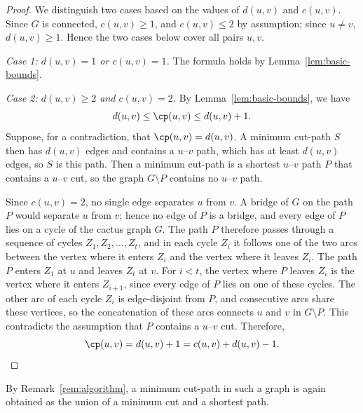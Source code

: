 \begin{proof}
We distinguish two cases based on the values of $d(u, v)$ and $c(u, v)$.
Since $G$ is connected, $c(u, v) \geq 1$, and $c(u, v) \leq 2$ by assumption; since $u \neq v$, $d(u, v) \geq 1$.
Hence the two cases below cover all pairs $u, v$.

\emph{Case 1: $d(u, v) = 1$ or $c(u, v) = 1$.}
The formula holds by Lemma~\ref{lem:basic-bounds}.

\emph{Case 2: $d(u, v) \geq 2$ and $c(u, v) = 2$.}
By Lemma~\ref{lem:basic-bounds}, we have
\[
d(u, v) \leq \cp(u, v) \leq d(u, v) + 1.
\]
Suppose, for a contradiction, that $\cp(u, v) = d(u, v)$.
A minimum cut-path $S$ then has $d(u, v)$ edges and contains a $u$--$v$ path, which has at least $d(u, v)$ edges, so $S$ is this path.
Then a minimum cut-path is a shortest $u$--$v$ path $P$ that contains a $u$--$v$ cut, so the graph $G \setminus P$ contains no $u$--$v$ path.

Since $c(u, v) = 2$, no single edge separates $u$ from $v$.
A bridge of $G$ on the path $P$ would separate $u$ from $v$; hence no edge of $P$ is a bridge, and every edge of $P$ lies on a cycle of the cactus graph $G$.
The path $P$ therefore passes through a sequence of cycles $Z_1, Z_2, \dots, Z_t$, and in each cycle $Z_i$ it follows one of the two arcs between the vertex where it enters $Z_i$ and the vertex where it leaves $Z_i$.
The path $P$ enters $Z_1$ at $u$ and leaves $Z_t$ at $v$.
For $i < t$, the vertex where $P$ leaves $Z_i$ is the vertex where it enters $Z_{i+1}$, since every edge of $P$ lies on one of these cycles.
The other arc of each cycle $Z_i$ is edge-disjoint from $P$, and consecutive arcs share these vertices, so the concatenation of these arcs connects $u$ and $v$ in $G \setminus P$.
This contradicts the assumption that $P$ contains a $u$--$v$ cut.
Therefore,
\[
\cp(u, v) = d(u, v) + 1 = c(u, v) + d(u, v) - 1. \qedhere
\]
\end{proof}

By Remark~\ref{rem:algorithm}, a minimum cut-path in such a graph is again obtained as the union of a minimum cut and a shortest path.
